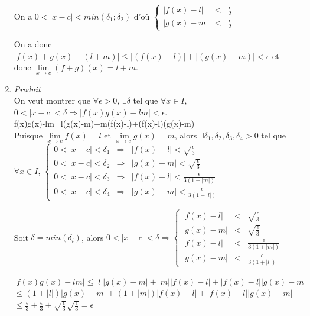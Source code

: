 \documentclass[a4paper,10pt]{book} %
\begin{document}
\begin{enumerate}
On a $0<|x-c|<min(\delta_{1};\delta_{2})$ d'où $\left\{\begin{array}{rcl}
|f(x)-l|&<&\frac{\epsilon}{2}\\
|g(x)-m|&<&\frac{\epsilon}{2}
\end{array} \right.$

\bigskip

On a donc $|f(x)+g(x)-(l+m)|\leq|(f(x)-l)|+|(g(x)-m)|<\epsilon$ et donc $\lim\limits_{x\rightarrow c}(f+g)(x)=l+m$.\\

\item \emph{Produit}\\

On veut montrer que $\forall \epsilon>0$, $\exists \delta$ tel que $\forall x\in I$, $0<|x-c|<\delta \Rightarrow |f(x)g(x)-lm|<\epsilon$.\\

f(x)g(x)-lm=l(g(x)-m)+m(f(x)-l)+(f(x)-l)(g(x)-m)\\

Puisque $\lim\limits_{x\rightarrow c} f(x)=l$ et $\lim\limits_{x\rightarrow c} g(x)=m$, alors $\exists\delta_{1},\delta_{2},\delta_{3},\delta_{4}>0$ tel que\\
$\forall x\in I$, $\left\{\begin{array}{rcl}
0<|x-c|<\delta_{1}&\Rightarrow &|f(x)-l|<\sqrt{\frac{\epsilon}{3}} \\
0<|x-c|<\delta_{2}&\Rightarrow &|g(x)-m|<\sqrt{\frac{\epsilon}{3}} \\
0<|x-c|<\delta_{3}&\Rightarrow &|f(x)-l|<\frac{\epsilon}{3(1+|m|)} \\
0<|x-c|<\delta_{4}&\Rightarrow &|g(x)-m|<\frac{\epsilon}{3(1+|l|)}
\end{array} \right.$

\bigskip

Soit $\delta=min(\delta_{i})$, alors $0<|x-c|<\delta \Rightarrow \left\{\begin{array}{rcl}
|f(x)-l|&<&\sqrt{\frac{\epsilon}{3}} \\
|g(x)-m|&<&\sqrt{\frac{\epsilon}{3}} \\
|f(x)-l|&<&\frac{\epsilon}{3(1+|m|)} \\
|g(x)-m|&<&\frac{\epsilon}{3(1+|l|)}
\end{array} \right.$

\bigskip

$|f(x)g(x)-lm|\leq |l||g(x)-m|+|m||f(x)-l|+|f(x)-l||g(x)-m|$\\
\hspace*{2.5cm}$\leq (1+|l|)|g(x)-m|+(1+|m|)|f(x)-l|+|f(x)-l||g(x)-m|$\\
\hspace*{2.5cm}$\leq \frac{\epsilon}{3}+\frac{\epsilon}{3}+\sqrt{\frac{\epsilon}{3}}\sqrt{\frac{\epsilon}{3}}=\epsilon$


\end{enumerate}
\end{document}

